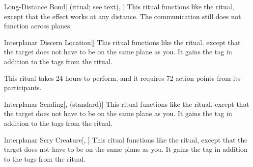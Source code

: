 \lowercase{\hypertarget{spell:Long-Distance Bond}{}}\label{spell:Long-Distance Bond}
\begin{attuneability}[\nth{5}]{\hypertarget{spell:Long-Distance Bond}{Long-Distance Bond}}[ (ritual; see text), ]
This ritual functions like the  ritual, except that the effect works at any distance.
The communication still does not function across planes.
\end{attuneability}
\vspace{0.25em}



\lowercase{\hypertarget{spell:Interplanar Discern Location}{}}\label{spell:Interplanar Discern Location}
\begin{apability}[\nth{6}]{\hypertarget{spell:Interplanar Discern Location}{Interplanar Discern Location}}[]
This ritual functions like the  ritual, except that the target does not have to be on the same plane as you.
It gains the  tag in addition to the tags from the  ritual.

This ritual takes 24 hours to perform, and it requires 72 action points from its participants.
\end{apability}
\vspace{0.25em}



\lowercase{\hypertarget{spell:Interplanar Sending}{}}\label{spell:Interplanar Sending}
\begin{apability}[\nth{6}]{\hypertarget{spell:Interplanar Sending}{Interplanar Sending}}[,  (standard)]
This ritual functions like the  ritual, except that the target does not have to be on the same plane as you.
It gains the  tag in addition to the tags from the  ritual.
\end{apability}
\vspace{0.25em}



\lowercase{\hypertarget{spell:Interplanar Scry Creature}{}}\label{spell:Interplanar Scry Creature}
\begin{apability}[\nth{7}]{\hypertarget{spell:Interplanar Scry Creature}{Interplanar Scry Creature}}[, ]
This ritual functions like the  ritual, except that the target does not have to be on the same plane as you.
It gains the  tag in addition to the tags from the  ritual.
\end{apability}
\vspace{0.25em}



